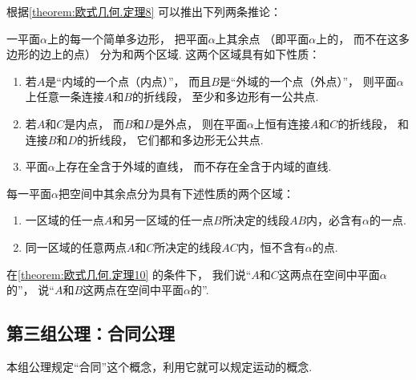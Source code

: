 根据\cref{theorem:欧式几何.定理8} 可以推出下列两条推论：
\begin{theorem}\label{theorem:欧式几何.定理9}
一平面\(\alpha\)上的每一个简单多边形，%
把平面\(\alpha\)上其余点%
（即平面\(\alpha\)上的，%
而不在这多边形的边上的点）%
分为和两个区域.
这两个区域具有如下性质：
\begin{enumerate}
	\item 若\(A\)是“内域的一个点（内点）”，%
	而且\(B\)是“外域的一个点（外点）”，%
	则平面\(\alpha\)上任意一条连接\(A\)和\(B\)的折线段，%
	至少和多边形有一公共点.

	\item 若\(A\)和\(C\)是内点，%
	而\(B\)和\(D\)是外点，%
	则在平面\(\alpha\)上恒有连接\(A\)和\(C\)的折线段，%
	和连接\(B\)和\(D\)的折线段，%
	它们都和多边形无公共点.

	\item 平面\(\alpha\)上存在全含于外域的直线，%
	而不存在全含于内域的直线.
\end{enumerate}
\end{theorem}

\begin{theorem}\label{theorem:欧式几何.定理10}
每一平面\(\alpha\)把空间中其余点分为具有下述性质的两个区域：
\begin{enumerate}
	\item 一区域的任一点\(A\)和另一区域的任一点\(B\)所决定的线段\(AB\)内，必含有\(\alpha\)的一点.
	\item 同一区域的任意两点\(A\)和\(C\)所决定的线段\(AC\)内，恒不含有\(\alpha\)的点.
\end{enumerate}
\end{theorem}

\begin{definition}
在\cref{theorem:欧式几何.定理10} 的条件下，%
我们说“\(A\)和\(C\)这两点在空间中平面\(\alpha\)的”，%
说“\(A\)和\(B\)这两点在空间中平面\(\alpha\)的”.
\end{definition}

\subsection{第三组公理：合同公理}
本组公理规定“合同”这个概念，利用它就可以规定运动的概念.

